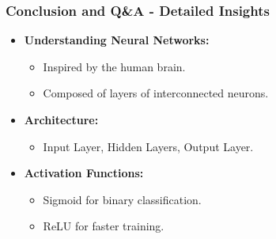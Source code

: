 \documentclass[aspectratio=169]{beamer}
\begin{document}
\begin{frame}[fragile]
    \frametitle{Conclusion and Q\&A - Detailed Insights}
    
    \begin{itemize}
        \item \textbf{Understanding Neural Networks:}
            \begin{itemize}
                \item Inspired by the human brain.
                \item Composed of layers of interconnected neurons.
            \end{itemize}
        
        \item \textbf{Architecture:}
            \begin{itemize}
                \item Input Layer, Hidden Layers, Output Layer.
            \end{itemize}

        \item \textbf{Activation Functions:}
            \begin{itemize}
                \item Sigmoid for binary classification.
                \item ReLU for faster training.
            \end{itemize}
    \end{itemize}
\end{frame}
\end{document}
